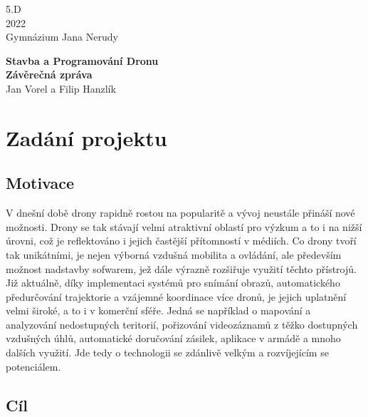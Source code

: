 \documentclass[12pt]{report}
\begin{document}
\begin{titlepage}
	\begin{flushright}
	5.D \\
	2022 \\
	Gymnázium Jana Nerudy
	\end{flushright}
	\vspace*{6cm}
	
	\begin{center}
		\textbf{\huge Stavba a Programování Dronu} \\
		\textbf{\huge Závěrečná zpráva } \\[\baselineskip]
		{\LARGE Jan Vorel a Filip Hanzlík}
	\end{center}		
\end{titlepage}


\tableofcontents

\chapter{Zadání projektu}

\section{Motivace}
V dnešní době drony rapidně rostou na popularitě a vývoj neustále přináší nové možnosti. Drony se tak stávají velmi atraktivní oblastí pro výzkum a to i na nižší úrovni, což je reflektováno i jejich častější přítomností v médiích. Co drony tvoří tak unikátními, je nejen výborná vzdušná mobilita a ovládání, ale především možnost nadstavby sofwarem, jež dále výrazně rozšiřuje využití těchto přístrojů. Již aktuálně, díky implementaci systémů pro snímání obrazů, automatického předurčování trajektorie a vzájemné koordinace více dronů, je jejich uplatnění velmi široké, a to i v komerční sféře. Jedná se například o mapování a analyzování nedostupných teritorií, pořizování videozáznamů z těžko dostupných vzdušných úhlů, automatické doručování zásilek, aplikace v armádě a mnoho dalších využití. Jde tedy o technologii se zdánlivě velkým a rozvíjejícím se potenciálem.

\section{Cíl}
\end{document}
